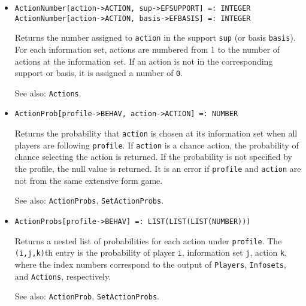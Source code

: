 \begin{itemize}




\item{}
\protect \large \begin{verbatim}
ActionNumber[action->ACTION, sup->EFSUPPORT] =: INTEGER 
ActionNumber[action->ACTION, basis->EFBASIS] =: INTEGER
\end{verbatim}\normalsize

\bd
Returns the number
assigned to \verb+action+ in the support \verb+sup+ (or basis
\verb+basis+).  For each information set, actions are numbered from 1
to the number of actions at the information set.  If an action is not
in the corresponding support or basis, it is assigned a number of \verb+0+.  

\item [See also:] \verb+Actions+.
\ed

\item{}
\protect \large \begin{verbatim}
ActionProb[profile->BEHAV, action->ACTION] =: NUMBER 
\end{verbatim}\normalsize

\bd
Returns the probability that \verb+action+ is chosen at its
information set when all players are following \verb+profile+.
If \verb+action+ is a chance action, the probability of chance selecting
the action is returned.  If the probability is not specified by the 
profile, the null value is returned.  It is an error if \verb+profile+
and \verb+action+ are not from the same extensive form game.

\item [See also:] \verb+ActionProbs+, \verb+SetActionProbs+.
\ed

\item{}
\protect \large \begin{verbatim}
ActionProbs[profile->BEHAV] =: LIST(LIST(LIST(NUMBER))) 
\end{verbatim}\normalsize

\bd 
Returns a nested list of probabilities for each action under
\verb+profile+.  The \verb+(i,j,k)+th entry is the probability of
player \verb+i+, information set \verb+j+, action \verb+k+, where the
index numbers correspond to the output of \verb+Players+, \verb+Infosets+,
and \verb+Actions+, respectively. 

\item [See also:] \verb+ActionProb+, \verb+SetActionProbs+.
\ed


\end{itemize}
